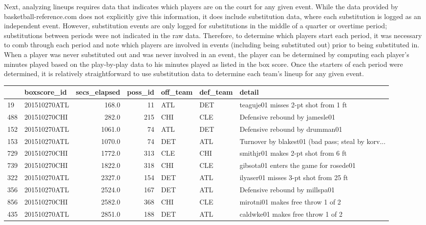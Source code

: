 Next, analyzing lineups requires data that indicates which players are on the court
for any given event. While the data provided by basketball-reference.com does not
explicitly give this information, it does include substitution data, where each
substitution is logged as an independent event. However, substitution events are
only logged for substitutions in the middle of a quarter or overtime period;
substitutions between periods were not indicated in the raw data. Therefore, to
determine which players start each period, it was necessary to comb through each
period and note which players are involved in events (including being substituted
out) prior to being substituted in. When a player was never substituted out and was
never involved in an event, the player can be determined by computing each player's
minutes played based on the play-by-play data to his minutes played as listed in the
box score. Once the starters of each period were determined, it is relatively
straightforward to use substitution data to determine each team's lineup for any
given event.


\begin{center}
\begin{tabular}{llrrlll}
\toprule
{} &   boxscore\_id &  secs\_elapsed &  poss\_id & off\_team & def\_team &                                             detail \\
\midrule
19  &  201510270ATL &         168.0 &       11 &      ATL &      DET &               teaguje01 misses 2-pt shot from 1 ft \\
488 &  201510270CHI &         282.0 &      215 &      CHI &      CLE &                     Defensive rebound by jamesle01 \\
152 &  201510270ATL &        1061.0 &       74 &      ATL &      DET &                     Defensive rebound by drumman01 \\
153 &  201510270ATL &        1070.0 &       74 &      DET &      ATL &  Turnover by blakest01 (bad pass; steal by korv... \\
729 &  201510270CHI &        1772.0 &      313 &      CLE &      CHI &                smithjr01 makes 2-pt shot from 6 ft \\
739 &  201510270CHI &        1822.0 &      318 &      CHI &      CLE &             gibsota01 enters the game for rosede01 \\
322 &  201510270ATL &        2327.0 &      154 &      DET &      ATL &              ilyaser01 misses 3-pt shot from 25 ft \\
356 &  201510270ATL &        2524.0 &      167 &      DET &      ATL &                     Defensive rebound by millspa01 \\
856 &  201510270CHI &        2582.0 &      368 &      CHI &      CLE &                  mirotni01 makes free throw 1 of 2 \\
435 &  201510270ATL &        2851.0 &      188 &      DET &      ATL &                  caldwke01 makes free throw 1 of 2 \\
\bottomrule
\end{tabular}
\end{center}

